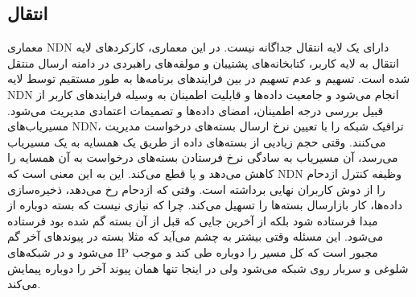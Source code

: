 \subsection{انتقال}
\label{section:enteghal}
معماری NDN  دارای یک لایه انتقال جداگانه نیست. در این معماری، کارکردهای لایه انتقال به لایه کاربر، کتابخانه‌های پشتیبان و مولفه‌‌های راهبردی در دامنه ارسال منتقل شده است. تسهیم و عدم تسهیم در بین فرایندهای برنامه‌ها به طور مستقیم توسط لایه NDN انجام می‌شود و جامعیت داده‌ها و قابلیت اطمینان به وسیله فرایندهای کاربر از قبیل بررسی درجه اطمینان، امضای داده‌ها و تصمیمات اعتمادی مدیریت می‌شود. 
مسیریاب‌‌های ‌NDN، ترافیک شبکه را با تعیین نرخ ارسال بسته‌های درخواست مدیریت می‌کنند.  وقتی حجم زیادیی از بسته‌های داده از طریق یک همسایه به یک مسیریاب می‌رسد، آن مسیریاب به سادگی نرخ فرستادن بسته‌های درخواست به آن همسایه را کاهش می‌دهد و یا قطع می‌کند. این به این معنی است که NDN وظیفه کنترل ازدحام را از دوش کاربران نهایی برداشته است. وقتی که ازدحام رخ می‌دهد، ذخیره‌سازی داده‌ها، کار بازارسال بسته‌ها را تسهیل می‌کند. چرا که نیازی نیست که بسته دوباره از مبدا فرستاده شود بلکه از آخرین جایی که قبل از آن بسته گم شده بود فرستاده می‌شود. این مسئله وقتی بیشتر به چشم می‌آید که مثلا بسته در پیوندهای آخر گم می‌شود و در شبکه‌‌های IP مجبور است که کل مسیر را دوباره طی کند و موجب شلوغی و سربار روی شبکه می‌شود ولی در اینجا تنها همان پیوند آخر را دوباره پیمایش می‌کند.   


